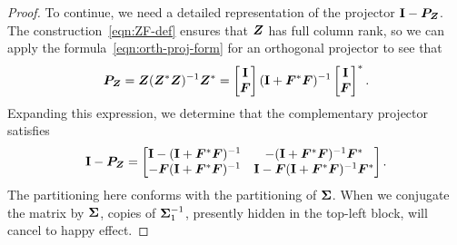 \documentclass[final]{siamltex}
\begin{document}
\begin{proof}
To continue, we need a detailed representation of the projector $\mathbf{I}
- \bm{P}_{\bm{Z}}$.  The construction~\eqref{eqn:ZF-def} ensures that
$\bm{Z}$ has full column rank, so we can apply the formula~\eqref{eqn:orth-proj-form}
for an orthogonal projector to see that
$$
\bm{P}_{\bm{Z}} = \bm{Z} (\bm{Z}^* \bm{Z})^{-1}
\bm{Z}^*
	= \begin{bmatrix} \mathbf{I} \\ \bm{F} \end{bmatrix}
        (\mathbf{I} + \bm{F}^*\bm{F})^{-1}
        \begin{bmatrix} \mathbf{I} \\ \bm{F} \end{bmatrix}^*.
$$
Expanding this expression, we determine that the complementary
projector satisfies
\begin{equation}
\Id - \mtx{P}_{\mtx{Z}}
    = \begin{bmatrix} \Id - (\Id + \mtx{F}^\adj \mtx{F})^{-1}
        & -(\Id + \mtx{F}^\adj \mtx{F})^{-1} \mtx{F}^\adj \\
        - \mtx{F} (\Id + \mtx{F}^\adj \mtx{F})^{-1}
        & \Id - \mtx{F}(\Id + \mtx{F}^\adj\mtx{F})^{-1} \mtx{F}^\adj
        \end{bmatrix}. \label{eqn:block-proj}
\end{equation}
The partitioning here conforms with the partitioning of
$\bm{\Sigma}$.  When we conjugate the matrix by
$\bm{\Sigma}$, copies of $\bm{\Sigma}_1^{-1}$, presently hidden
in the top-left block, will cancel to happy effect.



\end{proof}
\end{document}

